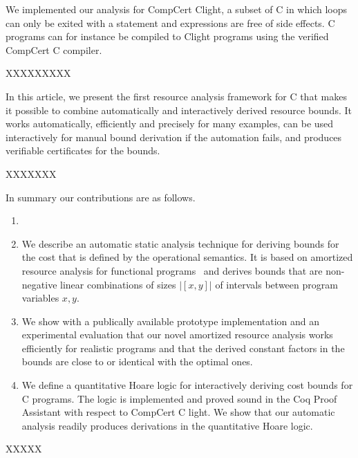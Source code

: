 \documentclass[nocopyrightspace,preprint]{sigplanconf}
\begin{document}
We implemented our analysis for CompCert Clight, a subset of C in
which loops can only be exited with a  statement and
expressions are free of side effects.  C programs can for instance be
compiled to Clight programs using the verified CompCert C compiler.
 


XXXXXXXXX


In this article, we present the first resource analysis framework for
C that makes it possible to combine automatically and interactively
derived resource bounds.  It works automatically, efficiently and
precisely for many examples, can be used interactively for manual
bound derivation if the automation fails, and produces verifiable
certificates for the bounds.  

XXXXXXX

In summary our contributions are as follows.
%
\begin{enumerate}
\item 

\item We describe an automatic static analysis technique for deriving
  bounds for the cost that is defined by the operational semantics.
  It is based on amortized resource analysis for functional
  programs~\cite{Jost03,HoffmannAH12} and derives bounds that are
  non-negative linear combinations of sizes $|[x,y]|$ of intervals
  between program variables $x,y$.
\item We show with a publically available prototype implementation and
  an experimental evaluation that our novel amortized resource
  analysis works efficiently for realistic programs and that the
  derived constant factors in the bounds are close to or identical
  with the optimal ones.
\item We define a quantitative Hoare logic for interactively deriving
  cost bounds for C programs.  The logic is implemented and proved
  sound in the Coq Proof Assistant with respect to CompCert C
  light.  We show that our automatic analysis readily produces
  derivations in the quantitative Hoare logic.
\end{enumerate}

XXXXX
\end{document}
